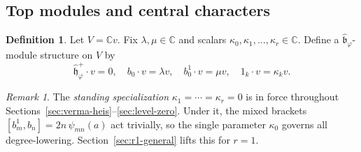 \documentclass{amsart}
\newcommand{\Cx}{\mathbb{C}}
\newcommand{\h}{\mathfrak{h}}
\newcommand{\wh}[1]{\widehat{#1}}
\newcommand{\whh}{\wh{\h}}
\theoremstyle{definition}
\newtheorem{definition}[theorem]{Definition}
\theoremstyle{remark}
\newtheorem{remark}[theorem]{Remark}
\numberwithin{equation}{section}
\begin{document}
\subsection{Top modules and central characters}
\begin{definition}\label{def:top1d}
Let $V=\Cx v$.  Fix $\lambda,\mu\in\Cx$ and scalars
$\kappa_0,\kappa_1,\dots,\kappa_r\in\Cx$.
Define a $\wh{\mathfrak b}_\varphi$-module structure on $V$ by
\[
\whh_\varphi^+\cdot v=0,\quad
b_0\cdot v=\lambda v,\quad
b_0^1\cdot v=\mu v,\quad
1_k\cdot v=\kappa_k v.
\]
\end{definition}
\begin{remark}\label{rem:why-chi-vanish}
The \emph{standing specialization} $\kappa_1=\cdots=\kappa_r=0$ is in
force throughout Sections~\ref{sec:verma-heis}--\ref{sec:level-zero}.
Under it, the mixed brackets $[b_m^1,b_n]=2n\,\psi_{mn}(a)$ act
trivially, so the single parameter $\kappa_0$ governs all degree-lowering.
Section~\ref{sec:r1-general} lifts this for $r=1$.
\end{remark}
\end{document}
